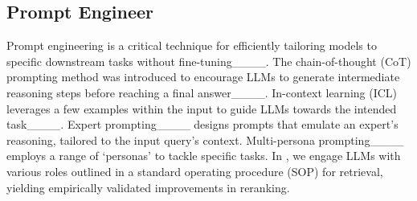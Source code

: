 \subsection{Prompt Engineer}
Prompt engineering is a critical technique for efficiently tailoring models to specific downstream tasks without fine-tuning____. The chain-of-thought (CoT) prompting method was introduced to encourage LLMs to generate intermediate reasoning steps before reaching a final answer____. In-context learning (ICL) leverages a few examples within the input to guide LLMs towards the intended task____. Expert prompting____ designs prompts that emulate an expert's reasoning, tailored to the input query's context. Multi-persona prompting____ employs a range of `personas' to tackle specific tasks. In \ours, we engage LLMs with various roles outlined in a standard operating procedure (SOP) for retrieval, yielding empirically validated improvements in reranking.